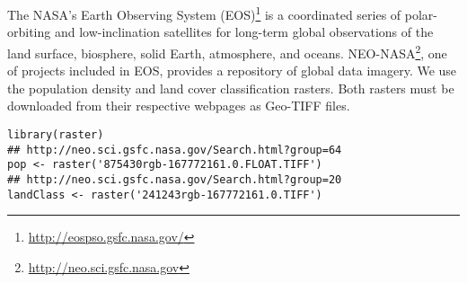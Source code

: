 The NASA's Earth Observing System (EOS)\footnote{\url{http://eospso.gsfc.nasa.gov/}} is a coordinated
series of polar-orbiting and low-inclination satellites for
long-term global observations of the land surface, biosphere, solid
Earth, atmosphere, and oceans. NEO-NASA\footnote{\url{http://neo.sci.gsfc.nasa.gov}}, one of projects
included in EOS, provides a repository of global data imagery. We
use the population density and land cover classification
rasters. Both rasters must be downloaded from their respective
webpages as Geo-TIFF files.

\lstset{language=R,numbers=none}
\begin{lstlisting}
library(raster)
## http://neo.sci.gsfc.nasa.gov/Search.html?group=64
pop <- raster('875430rgb-167772161.0.FLOAT.TIFF')
## http://neo.sci.gsfc.nasa.gov/Search.html?group=20
landClass <- raster('241243rgb-167772161.0.TIFF')
\end{lstlisting}
